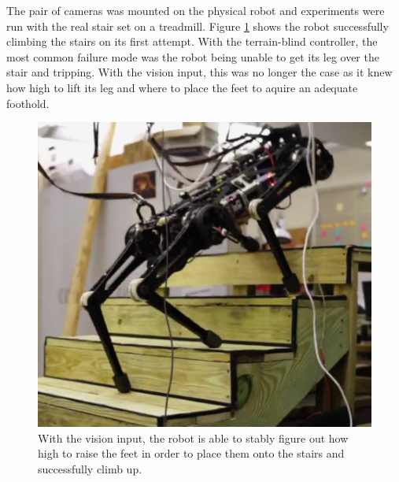 The pair of cameras was mounted on the physical robot and experiments were run with the real stair set on a treadmill. Figure \ref{fig:RS} shows the robot successfully climbing the stairs on its first attempt. With the terrain-blind controller, the most common failure mode was the robot being unable to get its leg over the stair and tripping. With the vision input, this was no longer the case as it knew how high to lift its leg and where to place the feet to aquire an adequate foothold.
\begin{figure}[!h]
\centering
\includegraphics[width=0.85\columnwidth]{Figures/RobotStairs.pdf}
\caption{With the vision input, the robot is able to stably figure out how high to raise the feet in order to place them onto the stairs and successfully climb up.}
\label{fig:RS}
\end{figure}